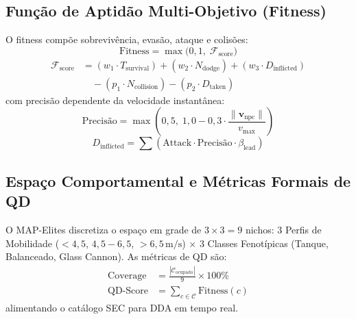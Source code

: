 \documentclass[10pt,conference,twocolumn]{article}
\begin{document}
\subsection{Função de Aptidão Multi-Objetivo (Fitness)}
O fitness compõe sobrevivência, evasão, ataque e colisões:
\begin{equation}
\text{Fitness} = \max\Big(0{,}1, \; \mathcal{F}_{\text{score}}\Big) \label{eq:fitness}
\end{equation}
\begin{align}
\mathcal{F}_{\text{score}} &= (w_1 \cdot T_{\text{survival}}) + (w_2 \cdot N_{\text{dodge}}) + (w_3 \cdot D_{\text{inflicted}}) \nonumber \\
&\quad - (p_1 \cdot N_{\text{collision}}) - (p_2 \cdot D_{\text{taken}}) \label{eq:fscore}
\end{align}
com precisão dependente da velocidade instantânea:
\begin{equation}
\text{Precisão} = \max\left(0{,}5, \; 1{,}0 - 0{,}3 \cdot \frac{\|\mathbf{v}_{\text{npc}}\|}{v_{\text{max}}}\right)
\end{equation}
\begin{equation}
D_{\text{inflicted}} = \sum \left(\text{Attack} \cdot \text{Precisão} \cdot \beta_{\text{lead}}\right)
\end{equation}

\begin{table}[h]
\centering
\caption{Matriz de Coeficientes da Função de Fitness}
\label{tab:pesos_fitness}
\end{table}

\subsection{Espaço Comportamental e Métricas Formais de QD}
O MAP-Elites \cite{mouret2015illuminating} discretiza o espaço em grade de $3 \times 3 = 9$ nichos: 3 Perfis de Mobilidade ($< 4{,}5$, $4{,}5 - 6{,}5$, $> 6{,}5\,\text{m/s}$) $\times$ 3 Classes Fenotípicas (Tanque, Balanceado, Glass Cannon). As métricas de QD \cite{kirk2020exploring} são:
\begin{align}
\text{Coverage} &= \frac{|\mathcal{C}_{\text{ocupado}}|}{9} \times 100\% \label{eq:coverage} \\
\text{QD-Score} &= \sum_{c \in \mathcal{C}} \text{Fitness}(c) \label{eq:qd_score}
\end{align}
alimentando o catálogo SEC \cite{glavin2015skilled} para DDA em tempo real.
\end{document}
